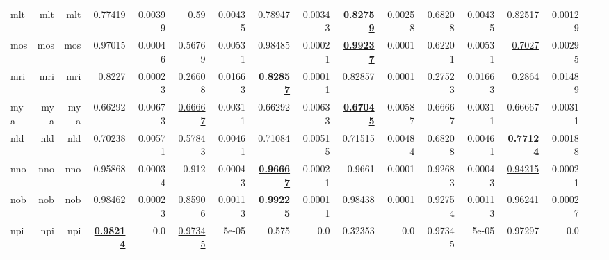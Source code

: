 \documentclass[11pt]{article}
\begin{document}
\begin{table*}[h]
{\begin{tabular}{lrrrrrrrrrrrrrrrr}
mlt         & mlt         & mlt         & 0.77419         & 0.00399         & 0.59         & 0.00435         & 0.78947         & 0.00343         & \textbf{\underline{0.82759}}         & 0.00258         & 0.68208         & 0.00435         & \underline{0.82517}         & 0.00129         \\
mos         & mos         & mos         & 0.97015         & 0.00046         & 0.56769         & 0.00531         & 0.98485         & 0.00021         & \textbf{\underline{0.99237}}         & 0.0001         & 0.62201         & 0.00531         & \underline{0.7027}         & 0.00295         \\
mri         & mri         & mri         & 0.8227         & 0.00023         & 0.26608         & 0.01663         & \textbf{\underline{0.82857}}         & 0.00011         & 0.82857         & 0.0001         & 0.27523         & 0.01663         & \underline{0.2864}         & 0.01489         \\
mya         & mya         & mya         & 0.66292         & 0.00673         & \underline{0.66667}         & 0.00311         & 0.66292         & 0.00633         & \textbf{\underline{0.67045}}         & 0.00587         & 0.66667         & 0.00311         & 0.66667         & 0.00311         \\
nld         & nld         & nld         & 0.70238         & 0.00571         & 0.57843         & 0.00461         & 0.71084         & 0.00515         & \underline{0.71515}         & 0.00484         & 0.68208         & 0.00461         & \textbf{\underline{0.77124}}         & 0.00188         \\
nno         & nno         & nno         & 0.95868         & 0.00034         & 0.912         & 0.00043         & \textbf{\underline{0.96667}}         & 0.00021         & 0.9661         & 0.0001         & 0.92683         & 0.00043         & \underline{0.94215}         & 0.00021         \\
nob         & nob         & nob         & 0.98462         & 0.00023         & 0.85906         & 0.00113         & \textbf{\underline{0.99225}}         & 0.00011         & 0.98438         & 0.0001         & 0.92754         & 0.00113         & \underline{0.96241}         & 0.00027         \\
npi         & npi         & npi         & \textbf{\underline{0.98214}}         & 0.0         & \underline{0.97345}         & 5e-05         & 0.575         & 0.0         & 0.32353         & 0.0         & 0.97345         & 5e-05         & 0.97297         & 0.0         \\

\end{tabular}}
\end{table*}
\end{document}
